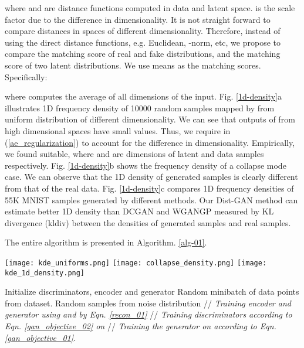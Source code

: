 \documentclass[runningheads]{llncs}
\newcommand*{\eg}{e.g. }
\begin{document}
where  and  are distance functions computed in data and latent space.  is the scale factor due to the difference in dimensionality. 
It is not straight forward to compare distances in spaces of different dimensionality. Therefore, instead of using the direct distance functions, \eg Euclidean, -norm, etc, we propose to  compare the matching score    of real and fake distributions,  and the matching score  of two latent distributions. We use means as the matching scores. Specifically:


where  computes the average of all dimensions of the input. Fig. \ref{1d-density}a illustrates 1D frequency density of 10000 random samples mapped by  from  uniform distribution of different dimensionality.
We can see that outputs of  from high dimensional spaces 
have small values. 
Thus, we require  in 
(\ref{ae_regularization}) to account for the difference in dimensionality.
Empirically, we found  suitable, where  and  are dimensions of latent and data samples respectively. 
Fig. \ref{1d-density}b shows the frequency density of a collapse mode case. We can observe that  the 1D density of generated samples is clearly different from that of the real data. Fig. \ref{1d-density}c compares 1D frequency densities of 55K MNIST samples generated by different methods. Our Dist-GAN method can estimate better 1D density than DCGAN and WGANGP measured by KL divergence (kldiv) between the densities of generated samples and real samples. 


The entire algorithm is presented in Algorithm. \ref{alg-01}.
\begin{figure*}
\centering
\texttt{[image: kde\_uniforms.png]}
\texttt{[image: collapse\_density.png]}
\texttt{[image: kde\_1d\_density.png]}
\caption{(a) The 1D frequency density of outputs using  from 
uniform distribution of different dimensionality. (b) One example of the density when mode collapse occurs. (c) The 1D density of real data and generated data obtained by different methods: DCGAN (kldiv: 0.00979), WGANGP (kldiv: 0.00412), Dist-GAN (without data-latent distance constraint of AE, kldiv: 0.01027), and Dist-GAN (kldiv: 0.00073).}
\label{1d-density}
\end{figure*}
\begin{algorithm*}
 \footnotesize
 \caption{Dist-GAN}
 \begin{algorithmic}[1]
 \STATE Initialize discriminators, encoder and generator 
 \REPEAT
  \STATE  Random minibatch of  data points from dataset.
  \STATE  Random  samples from noise distribution 
  \STATE // \textit{Training encoder and generator using  and  by Eqn. \ref{recon_01}}
  \STATE 
\STATE // \textit{Training discriminators according to Eqn. \ref{gan_objective_02} on } \STATE   
  \STATE // \textit{Training the generator on   according to Eqn. \ref{gan_objective_01}.} \STATE   \UNTIL
 \RETURN  
 \end{algorithmic} 
 \label{alg-01}
\end{algorithm*} 
\end{document}
